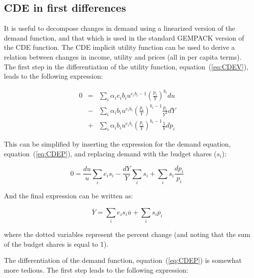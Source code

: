 \subsection{CDE in first differences}

It is useful to decompose changes in demand using a linearized version of the
demand function, and that which is used in the standard GEMPACK version of the CDE function.
The CDE implicit utility function can be used to derive a relation between changes in
income, utility and prices (all in per capita terms). The first step in the
differentiation of the utility function, equation~(\ref{eq:CDEV}), leads to the
following expression:

\[\begin{array}{*{20}{l}}
0& = &{\sum\limits_i {\displaystyle {\alpha_i}{e_i}{b_i}{u^{{e_i}{b_i} - 1}}{{\left( {\frac{{{p_i}}}{Y}} \right)}^{{b_i}}}du} }\\
{}& - &{\sum\limits_i {\displaystyle{\alpha_i}{b_i}{u^{{e_i}{b_i}}}{{\left( {\frac{p_i}{Y}} \right)}^{{b_i} - 1}}\frac{{{p_i}}}{{{Y^2}}}dY} }\\
{}& + &{\sum\limits_i {\displaystyle{\alpha_i}{b_i}{u^{{e_i}{b_i}}}{{\left( {\frac{p_i}{Y}} \right)}^{{b_i} - 1}}\frac{1}{Y}d{p_i}} }
\end{array}\]

\noindent This can be simplified by inserting the expression for the demand equation, equation~(\ref{eq:CDEP}),
and replacing demand with the budget shares ($s_i$):

\[0 = \frac{{du}}{u}\sum\limits_i {{e_i}{s_i}}  - \frac{{dY}}{Y}\sum\limits_i {{s_i}}  + \sum\limits_i {{s_i}\frac{{d{p_i}}}{{{p_i}}}}
\]

\noindent And the final expression can be written as:

\begin{equation}
\label{eq:YPCT}
\overset{.}{Y}=\sum_i{e_is_i}\overset{.}{u}+\sum_i{s_i\overset{.}{p_i}}
\end{equation}

\noindent where the dotted variables represent the percent change (and noting that the sum of the budget shares is equal to 1).

The differentiation of the demand function, equation~(\ref{eq:CDEP}) is somewhat more tedious. The first step
leads to the following expression:

